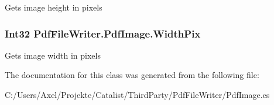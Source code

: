 Gets image height in pixels 

\subsubsection[{\texorpdfstring{Width\+Pix}{WidthPix}}]{\setlength{\rightskip}{0pt plus 5cm}Int32 Pdf\+File\+Writer.\+Pdf\+Image.\+Width\+Pix\hspace{0.3cm}{\ttfamily [get]}}\hypertarget{class_pdf_file_writer_1_1_pdf_image_ae62470dc162a4bbb1694fe9cffaafd66}{}\label{class_pdf_file_writer_1_1_pdf_image_ae62470dc162a4bbb1694fe9cffaafd66}


Gets image width in pixels 



The documentation for this class was generated from the following file\+:\begin{DoxyCompactItemize}
\item 
C\+:/\+Users/\+Axel/\+Projekte/\+Catalist/\+Third\+Party/\+Pdf\+File\+Writer/Pdf\+Image.\+cs\end{DoxyCompactItemize}
